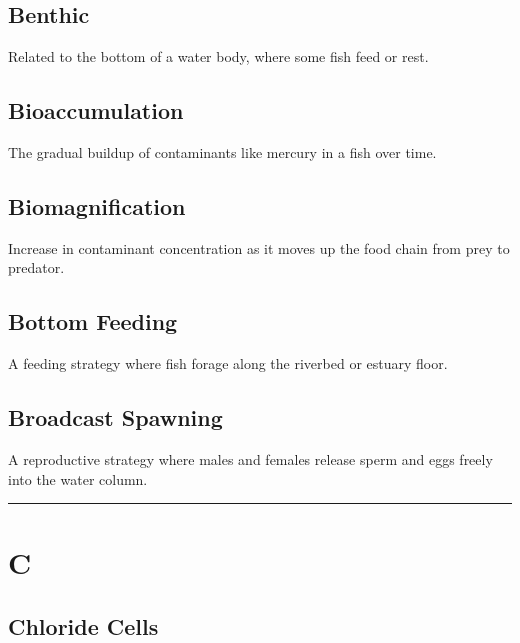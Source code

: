 \documentclass[
]{book}
\begin{document}
\subsection{\texorpdfstring{\textbf{Benthic}}{Benthic}}\label{benthic}

Related to the bottom of a water body, where some fish feed or rest.

\subsection{\texorpdfstring{\textbf{Bioaccumulation}}{Bioaccumulation}}\label{bioaccumulation}

The gradual buildup of contaminants like mercury in a fish over time.

\subsection{\texorpdfstring{\textbf{Biomagnification}}{Biomagnification}}\label{biomagnification}

Increase in contaminant concentration as it moves up the food chain from prey to predator.

\subsection{\texorpdfstring{\textbf{Bottom Feeding}}{Bottom Feeding}}\label{bottom-feeding}

A feeding strategy where fish forage along the riverbed or estuary floor.

\subsection{\texorpdfstring{\textbf{Broadcast Spawning}}{Broadcast Spawning}}\label{broadcast-spawning}

A reproductive strategy where males and females release sperm and eggs freely into the water column.

\begin{center}\rule{0.5\linewidth}{0.5pt}\end{center}

\section*{C}\label{c}

\subsection{\texorpdfstring{\textbf{Chloride Cells}}{Chloride Cells}}\label{chloride-cells}
\end{document}

